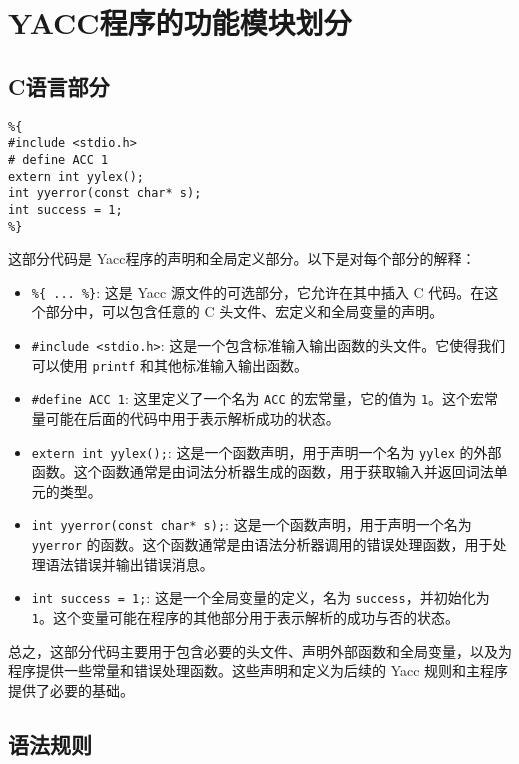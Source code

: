 \documentclass[lang=cn,11pt,a4paper]{elegantpaper}
\begin{document}
\section{YACC程序的功能模块划分}

\subsection{C语言部分}
\begin{lstlisting}
%{
#include <stdio.h>
# define ACC 1
extern int yylex();
int yyerror(const char* s);
int success = 1;
%}
\end{lstlisting}

这部分代码是 Yacc程序的声明和全局定义部分。以下是对每个部分的解释：
\begin{itemize}
    \item \lstinline"%{ ... %}": 这是 Yacc 源文件的可选部分，它允许在其中插入 C 代码。在这个部分中，可以包含任意的 C 头文件、宏定义和全局变量的声明。
    \item \lstinline{#include <stdio.h>}: 这是一个包含标准输入输出函数的头文件。它使得我们可以使用 \lstinline{printf} 和其他标准输入输出函数。
    \item \lstinline{#define ACC 1}: 这里定义了一个名为 \lstinline{ACC} 的宏常量，它的值为 \lstinline{1}。这个宏常量可能在后面的代码中用于表示解析成功的状态。
    \item \lstinline{extern int yylex();}: 这是一个函数声明，用于声明一个名为 \lstinline{yylex} 的外部函数。这个函数通常是由词法分析器生成的函数，用于获取输入并返回词法单元的类型。
    \item \lstinline{int yyerror(const char* s);}: 这是一个函数声明，用于声明一个名为 \lstinline{yyerror} 的函数。这个函数通常是由语法分析器调用的错误处理函数，用于处理语法错误并输出错误消息。
    \item \lstinline{int success = 1;}: 这是一个全局变量的定义，名为 \lstinline{success}，并初始化为 \lstinline{1}。这个变量可能在程序的其他部分用于表示解析的成功与否的状态。
\end{itemize}


总之，这部分代码主要用于包含必要的头文件、声明外部函数和全局变量，以及为程序提供一些常量和错误处理函数。这些声明和定义为后续的 Yacc 规则和主程序提供了必要的基础。

\subsection{语法规则}
\end{document}
